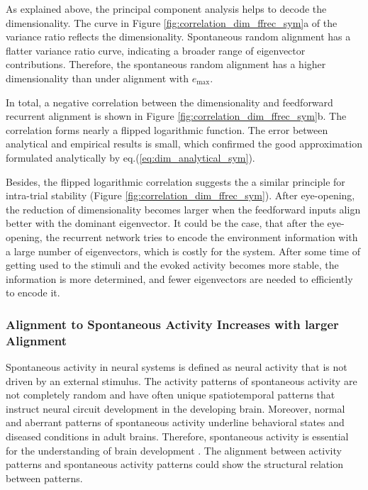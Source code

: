\documentclass[11pt]{article}
\begin{document}
	As explained above, the principal component analysis helps to decode the dimensionality. The curve in Figure \ref{fig:correlation_dim_ffrec_sym}a of the variance ratio reflects the dimensionality. Spontaneous random alignment has a flatter variance ratio curve, indicating a broader range of eigenvector contributions. Therefore, the spontaneous random alignment has a higher dimensionality than under alignment with $e_{\text{max}}$. 
	
	In total, a negative correlation between the dimensionality and feedforward recurrent alignment is shown in Figure \ref{fig:correlation_dim_ffrec_sym}b. The correlation forms nearly a flipped logarithmic function. The error between analytical and empirical results is small, which confirmed the good approximation formulated analytically by eq.(\ref{eq:dim_analytical_sym}). 
	
	Besides, the flipped logarithmic correlation suggests the a similar principle for intra-trial stability (Figure \ref{fig:correlation_dim_ffrec_sym}). After eye-opening, the reduction of dimensionality becomes larger when the feedforward inputs align better with the dominant eigenvector. It could be the case, that after the eye-opening, the recurrent network tries to encode the environment information with a large number of eigenvectors, which is costly for the system. After some time of getting used to the stimuli and the evoked activity becomes more stable, the information is more determined, and fewer eigenvectors are needed to efficiently to encode it.
	
	\subsubsection{Alignment to Spontaneous Activity Increases with larger Alignment}
	
	Spontaneous activity in neural systems is defined as neural activity that is not driven by an external stimulus. The activity patterns of spontaneous activity are not completely random and have often unique spatiotemporal patterns that instruct neural circuit development in the developing brain. Moreover, normal and aberrant patterns of spontaneous activity underline behavioral states and diseased conditions in adult brains. Therefore, spontaneous activity is essential for the understanding of brain development \cite{imaizumi2018spontaneous}. The alignment between activity patterns and spontaneous activity patterns could show the structural relation between patterns. %
	
\end{document}
